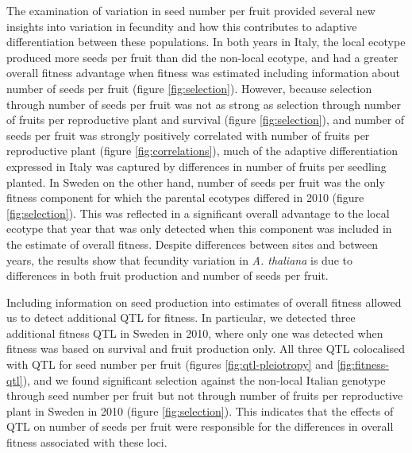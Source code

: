\documentclass[12pt,]{article}
\begin{document}
The examination of variation in seed number per fruit provided several new insights into variation in fecundity and how this contributes to adaptive differentiation between these populations.
In both years in Italy, the local ecotype produced more seeds per fruit than did the non-local ecotype, and had a greater overall fitness advantage when fitness was estimated including information about number of seeds per fruit (figure \ref{fig:selection}).
However, because selection through number of seeds per fruit was not as strong as selection through number of fruits per reproductive plant and survival (figure \ref{fig:selection}), and number of seeds per fruit was strongly positively correlated with number of fruits per reproductive plant (figure \ref{fig:correlations}), much of the adaptive differentiation expressed in Italy was captured by differences in number of fruits per seedling planted.
In Sweden on the other hand, number of seeds per fruit was the only fitness component for which the parental ecotypes differed in 2010 (figure \ref{fig:selection}).
This was reflected in a significant overall advantage to the local ecotype that year that was only detected when this component was included in the estimate of overall fitness.
Despite differences between sites and between years, the results show that fecundity variation in \emph{A. thaliana} is due to differences in both fruit production and number of seeds per fruit.

Including information on seed production into estimates of overall fitness allowed us to detect additional QTL for fitness. In particular, we detected three additional fitness QTL in Sweden in 2010, where only one was detected when fitness was based on survival and fruit production only. All three QTL colocalised with QTL for seed number per fruit (figures \ref{fig:qtl-pleiotropy} and \ref{fig:fitness-qtl}), and we found significant selection against the non-local Italian genotype through seed number per fruit but not through number of fruits per reproductive plant in Sweden in 2010 (figure \ref{fig:selection}). This indicates that the effects of QTL on number of seeds per fruit were responsible for the differences in overall fitness associated with these loci.
\end{document}
